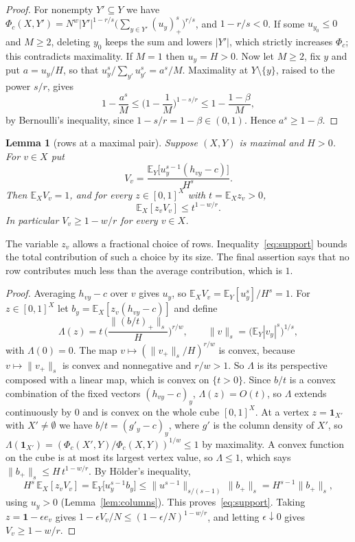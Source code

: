 \documentclass[11pt]{article}
\newtheorem{lemma}[theorem]{Lemma}
\theoremstyle{definition}
\theoremstyle{remark}
\newcommand{\E}{\mathbb{E}}
\begin{document}
\begin{proof}
For nonempty $Y'\subseteq Y$ we have $\Phi_c(X,Y')=N^w|Y'|^{1-r/s}\big(\sum_{y\in Y'}(u_y)_+^s\big)^{r/s}$, and
$1-r/s<0$. If some $u_{y_0}\le0$ and $M\ge2$, deleting $y_0$ keeps the sum and lowers $|Y'|$, which strictly increases
$\Phi_c$; this contradicts maximality. If $M=1$ then $u_y=H>0$. Now let $M\ge2$, fix $y$ and put $a=u_y/H$, so that
$u_y^s/\sum_{y'}u_{y'}^s=a^s/M$. Maximality at $Y\setminus\{y\}$, raised to the power $s/r$, gives
\[
1-\frac{a^s}M\le\Big(1-\frac1M\Big)^{1-s/r}\le1-\frac{1-\beta}M,
\]
by Bernoulli's inequality, since $1-s/r=1-\beta\in(0,1)$. Hence $a^s\ge1-\beta$.
\end{proof}

\begin{lemma}[rows at a maximal pair]\label{lem:rows}
Suppose $(X,Y)$ is maximal and $H>0$. For $v\in X$ put
\[
V_v=\frac{\E_Y\big[u_y^{s-1}(h_{vy}-c)\big]}{H^s}.
\]
Then $\E_XV_v=1$, and for every $z\in[0,1]^X$ with $t=\E_Xz_v>0$,
\begin{equation}\label{eq:support}
\E_X[z_vV_v]\le t^{1-w/r}.
\end{equation}
In particular $V_v\ge1-w/r$ for every $v\in X$.
\end{lemma}

The variable $z_v$ allows a fractional choice of rows. Inequality~\eqref{eq:support} bounds the total
contribution of such a choice by its size. The final assertion says that no row contributes much less than
the average contribution, which is $1$.

\begin{proof}
Averaging $h_{vy}-c$ over $v$ gives $u_y$, so $\E_XV_v=\E_Y[u_y^s]/H^s=1$. For $z\in[0,1]^X$ let
$b_y=\E_X[z_v(h_{vy}-c)]$ and define
\[
\Lambda(z)=t\,\Big(\frac{\|(b/t)_+\|_s}{H}\Big)^{r/w},\qquad \|v\|_s=\big(\E_Y|v_y|^s\big)^{1/s},
\]
with $\Lambda(0)=0$. The map $v\mapsto(\|v_+\|_s/H)^{r/w}$ is convex, because $v\mapsto\|v_+\|_s$ is convex and
nonnegative and $r/w>1$. So $\Lambda$ is its perspective composed with a linear map, which is convex on $\{t>0\}$. Since
$b/t$ is a convex combination of the fixed vectors $(h_{vy}-c)_y$, $\Lambda(z)=O(t)$, so $\Lambda$ extends continuously
by $0$ and is convex on the whole cube $[0,1]^X$. At a vertex $z=\mathbf 1_{X'}$ with $X'\ne\emptyset$ we have
$b/t=(g'_y-c)_y$, where $g'$ is the column density of $X'$, so
$\Lambda(\mathbf 1_{X'})=(\Phi_c(X',Y)/\Phi_c(X,Y))^{1/w}\le1$ by maximality. A convex function on the cube is at most
its largest vertex value, so $\Lambda\le1$, which says $\|b_+\|_s\le H\,t^{1-w/r}$. By H\"older's inequality,
\[
H^s\,\E_X[z_vV_v]=\E_Y\big[u_y^{s-1}b_y\big]\le\big\|u^{s-1}\big\|_{s/(s-1)}\,\|b_+\|_s=H^{s-1}\|b_+\|_s,
\]
using $u_y>0$ (Lemma~\ref{lem:columns}). This proves~\eqref{eq:support}. Taking $z=\mathbf 1-\epsilon e_v$ gives
$1-\epsilon V_v/N\le(1-\epsilon/N)^{1-w/r}$, and letting $\epsilon\downarrow0$ gives $V_v\ge1-w/r$.
\end{proof}
\end{document}

